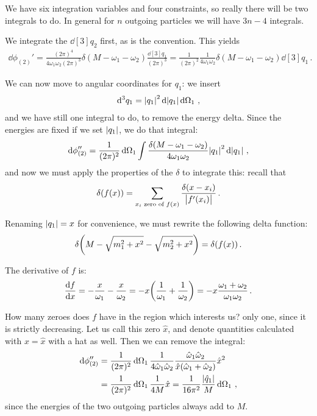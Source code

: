 \documentclass[main.tex]{subfiles}
\begin{document}
We have six integration variables and four constraints, so really there will be two integrals to do. In general for \(n\) outgoing particles we will have \(3n - 4\) integrals. 

We integrate the \(\dd[3]{q_2 }\) first, as is the convention. This yields 
%
\begin{align}
\dd{\phi}_{(2)}' 
= \frac{(2\pi )^{4}}{4 \omega_1 \omega_2 (2 \pi )^3 } \delta (M - \omega_1 - \omega_2 ) \frac{ \dd[3]{q_1 }}{(2 \pi )^3} 
= \frac{1}{(2\pi )^2} \frac{1}{4 \omega_1 \omega_2 } \delta (M - \omega_1 - \omega_2 ) \dd[3]{q_1 }
\,.
\end{align}

We can now move to angular coordinates for \(q_1 \): we insert 
%
\begin{align}
\dd[3]{q_1 } = \abs{q_1 }^2 \dd{ \abs{q_1 }} \dd{\Omega_1 }
\,,
\end{align}
%
and we have still one integral to do, to remove the energy delta.
Since the energies are fixed if we set \(\abs{q_1 }\), we do that integral: 
%
\begin{align}
\dd{\phi }_{(2)}'' = \frac{1}{(2\pi )^2}
\dd{\Omega_1 }
\int \frac{\delta (M - \omega_1 - \omega_2 )}{4 \omega_1 \omega_2 }\abs{q_1 }^2 \dd{ \abs{q_1 }}
\,,
\end{align}
%
and now we must apply the properties of the \(\delta\) to integrate this: recall that 
%
\begin{align}
\delta (f(x)) = \sum _{x_i \text{ zero of } f(x)}
\frac{ \delta (x- x_i)}{\abs{f'(x_i)}}
\,.
\end{align}

Renaming \(\abs{q_1 } = x\) for convenience, we must rewrite the following delta function: 
%
\begin{align}
\delta \qty(M - \sqrt{m_1^2 + x^2} - \sqrt{m_2^2 + x^2}) = \delta (f(x))
\,.
\end{align}

The derivative of \(f\) is:
%
\begin{align} \label{eq:center-of-mass-derivative-of-sqrt-s}
\dv{f}{x} = - \frac{x}{\omega_1 } - \frac{x}{\omega_2 } = - x \qty( \frac{1}{\omega_1 } + \frac{1}{\omega_2 }) 
= - x \frac{\omega_1 + \omega_2 }{\omega_1 \omega_2 }
\,.
\end{align}

How many zeroes does \(f\) have in the region which interests us? only one, since it is strictly decreasing. 
Let us call this zero \(\hat{x}\), and denote quantities calculated with \(x = \hat{x}\) with a hat as well. Then we can remove the integral: 
%
\begin{align}
\dd{\phi }_{(2)}'' &= \frac{1}{(2\pi )^2}
\dd{\Omega_1 }
\frac{1}{4 \hat{\omega}_{1} \hat{\omega}_{2}} \frac{\hat{\omega}_{1} \hat{\omega}_{2}}{\hat{x} (\hat{\omega}_{1} + \hat{\omega}_{2})}
\hat{x}^2  \\
&= \frac{1}{(2\pi )^2}
\dd{\Omega_1 }
\frac{1}{4M} \hat{x} 
= \frac{1}{16 \pi^2} \frac{\abs{\hat{q}_{1}}}{M} \dd{\Omega_1 }
\,,
\end{align}
%
since the energies of the two outgoing particles always add to \(M\). 
\end{document}
